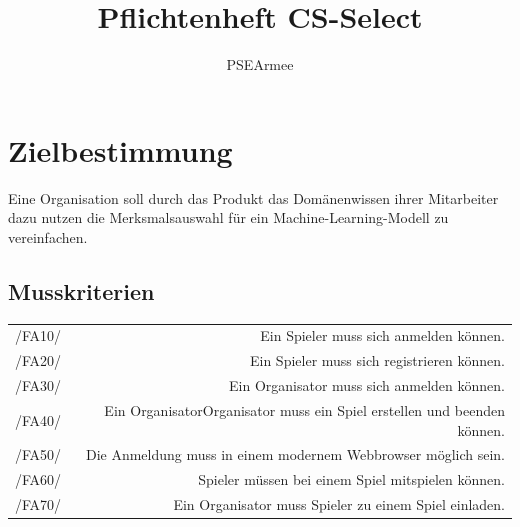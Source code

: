 \documentclass[a4paper]{scrreprt}
\begin{document}
 
\title{Pflichtenheft CS-Select}
\author{PSEArmee}
\maketitle
 
\tableofcontents
 
\chapter{Zielbestimmung}
Eine Organisation soll durch das \Gls{Produkt} das Domänenwissen ihrer Mitarbeiter dazu nutzen die Merksmalsauswahl für ein Machine-Learning-Modell zu vereinfachen.

\section{Musskriterien}
\begin{tabular}{ l | r}
/FA10/ & Ein \Gls{Spieler} muss sich anmelden können. \\ 
/FA20/ & Ein \Gls{Spieler} muss sich registrieren können. \\
/FA30/ & Ein \Gls{Organisator} muss sich anmelden können. \\
/FA40/ & Ein \Gls{Organisator}\Gls{Organisator} muss ein \Gls{Spiel} erstellen und beenden können. \\
/FA50/ & Die Anmeldung muss in einem modernem \Gls{Webbrowser} möglich sein. \\
/FA60/ & \Gls{Spieler} müssen bei einem \Gls{Spiel} mitspielen können. \\
/FA70/ & Ein \Gls{Organisator} muss \Gls{Spieler} zu einem \Gls{Spiel} einladen. \\
\end{tabular}
\end{document}
